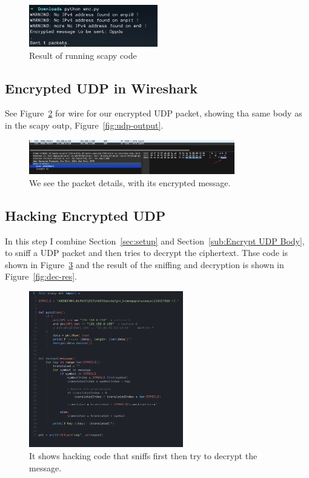 \documentclass{article}
\begin{document}
\begin{figure}[!hb]
	\centering
	\includegraphics[width=0.5\textwidth]{figures/send-udp-enc}
	\caption{Result of running scapy code}
	\label{fig:scapy-run}
\end{figure}

\subsection{Encrypted UDP in Wireshark} %
\label{sub:Encrypted UDP in Wireshark}
See Figure~\ref{fig:enc-udp-wire} for wire for our encrypted UDP packet,
showing tha same body as in the scapy outp, Figure~\ref{fig:udp-output}.
\begin{figure}[!hb]
	\centering
	\includegraphics[width=0.8\textwidth]{figures/enc-udp-wire}
	\caption{We see the packet details, with its encrypted message.}
	\label{fig:enc-udp-wire}
\end{figure}

\subsection{Hacking Encrypted UDP} %
\label{sub:Hacking Encrypted UDP}
In this step I combine Section~\ref{sec:setup} and Section~\ref{sub:Encrypt UDP Body}, to sniff
a UDP packet and then tries to decrypt the ciphertext. Thse code is shown in Figure~\ref{fig:dec-code} and
the result of the sniffing and decryption is shown in Figure~\ref{fig:dec-res}.

\begin{figure}[!hb]
	\centering
	\includegraphics[width=0.6\textwidth]{figures/dec-code}
	\caption{It shows hacking code that sniffs first then try to decrypt the message.}
	\label{fig:dec-code}
\end{figure}
\end{document}
